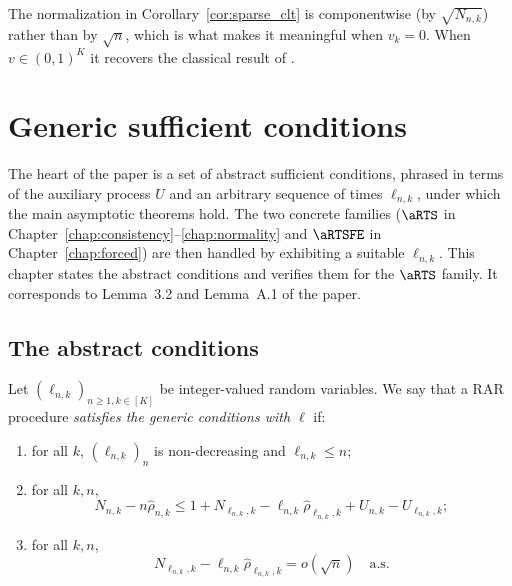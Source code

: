 \begin{remark}\label{rem:sparse_normalization}
The normalization in Corollary~\ref{cor:sparse_clt} is componentwise (by
$\sqrt{N_{n,k}}$) rather than by $\sqrt n$, which is what makes it meaningful when
$v_k=0$. When $v\in(0,1)^K$ it recovers the classical result of
\cite{hu2006asymptotically}.
\end{remark}


\chapter{Generic sufficient conditions}
\label{chap:generic}

The heart of the paper is a set of abstract sufficient conditions, phrased in
terms of the auxiliary process $U$ and an arbitrary sequence of times
$\ell_{n,k}$, under which the main asymptotic theorems hold. The two concrete
families ($\aRTS$ in Chapter~\ref{chap:consistency}--\ref{chap:normality} and
$\aRTSFE$ in Chapter~\ref{chap:forced}) are then handled by exhibiting a suitable
$\ell_{n,k}$. This chapter states the abstract conditions and verifies them for
the $\aRTS$ family. It corresponds to Lemma~3.2 and Lemma~A.1 of the paper.

\section{The abstract conditions}
\label{sec:generic_conditions}

\begin{definition}\label{def:generic_cond}
Let $(\ell_{n,k})_{n\ge1, k\in[K]}$ be integer-valued random variables. We say
that a RAR procedure \emph{satisfies the generic conditions with $\ell$} if:
\begin{enumerate}
  \item[(i)] for all $k$, $(\ell_{n,k})_n$ is non-decreasing and $\ell_{n,k}\le n$;
  \item[(ii)] for all $k,n$,
        \begin{equation}\label{eq:generic_ineq}
          N_{n,k} - n\hat{\rho}_{n,k}
          \le 1 + N_{\ell_{n,k},k} - \ell_{n,k}\hat{\rho}_{\ell_{n,k},k}
             + U_{n,k} - U_{\ell_{n,k},k};
        \end{equation}
  \item[(iii)] for all $k,n$,
        \begin{equation}\label{eq:generic_small}
          N_{\ell_{n,k},k} - \ell_{n,k}\hat{\rho}_{\ell_{n,k},k} = o(\sqrt n)
          \quad\text{a.s.}
        \end{equation}
\end{enumerate}
\end{definition}

